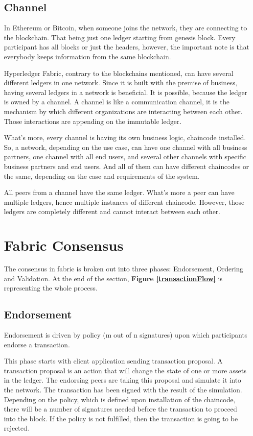 \documentclass[a4paper,11pt]{report}
\begin{document}
\subsection{Channel}
In Ethereum or Bitcoin, when someone joins the network, they are connecting to the blockchain. That being just one ledger starting from genesis block. Every participant has all blocks or just the headers, however, the important note is that everybody keeps information from the same blockchain.

	Hyperledger Fabric, contrary to the blockchains mentioned, can have several different ledgers in one network. Since it is built with the premise of business, having several ledgers in a network is beneficial. It is possible, because the ledger is owned by a channel. A channel is like a communication channel, it is the mechanism by which different organizations are interacting between each other. Those interactions are appending on the immutable ledger. 
	
What's more, every channel is having its own business logic, chaincode installed. So, a network, depending on the use case, can have one channel with all business partners, one channel with all end users, and several other channels with specific business partners and end users. And all of them can have different chaincodes or the same, depending on the case and requirements of the system.

All peers from a channel have the same ledger. What's more a peer can have multiple ledgers, hence multiple instances of different chaincode. However, those ledgers are completely different and cannot interact between each other.


\section{Fabric Consensus}
\label{fabricConsensus}
The consensus in fabric is broken out into three phases: Endorsement, Ordering and Validation. At the end of the section, \textbf{Figure \ref{transactionFlow}} is representing the whole process. 

\subsection{Endorsement}
Endorsement is driven by policy (m out of n signatures) upon which participants endorse a transaction.

	This phase starts with client application sending transaction proposal. A transaction proposal is an action that will change the state of one or more assets in the ledger. The endorsing peers are taking this proposal and simulate it into the network. The transaction has been signed with the result of the simulation. Depending on the policy, which is defined upon installation of the chaincode, there will be a number of signatures needed before the transaction to proceed into the block. If the policy is not fulfilled, then the transaction is going to be rejected.
	    
\end{document}
